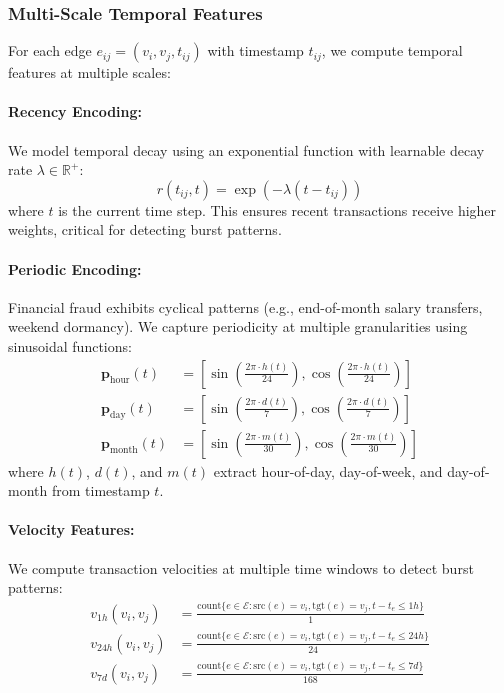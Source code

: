 \subsubsection{Multi-Scale Temporal Features}

For each edge $e_{ij} = (v_i, v_j, t_{ij})$ with timestamp $t_{ij}$, we compute temporal features at multiple scales:

\paragraph{Recency Encoding:} We model temporal decay using an exponential function with learnable decay rate $\lambda \in \mathbb{R}^+$:
\begin{equation}
    r(t_{ij}, t) = \exp\left(-\lambda (t - t_{ij})\right)
\end{equation}
where $t$ is the current time step. This ensures recent transactions receive higher weights, critical for detecting burst patterns.

\paragraph{Periodic Encoding:} Financial fraud exhibits cyclical patterns (e.g., end-of-month salary transfers, weekend dormancy). We capture periodicity at multiple granularities using sinusoidal functions:
\begin{align}
    \mathbf{p}_{\text{hour}}(t) &= \left[\sin\left(\frac{2\pi \cdot h(t)}{24}\right), \cos\left(\frac{2\pi \cdot h(t)}{24}\right)\right] \\
    \mathbf{p}_{\text{day}}(t) &= \left[\sin\left(\frac{2\pi \cdot d(t)}{7}\right), \cos\left(\frac{2\pi \cdot d(t)}{7}\right)\right] \\
    \mathbf{p}_{\text{month}}(t) &= \left[\sin\left(\frac{2\pi \cdot m(t)}{30}\right), \cos\left(\frac{2\pi \cdot m(t)}{30}\right)\right]
\end{align}
where $h(t)$, $d(t)$, and $m(t)$ extract hour-of-day, day-of-week, and day-of-month from timestamp $t$.

\paragraph{Velocity Features:} We compute transaction velocities at multiple time windows to detect burst patterns:
\begin{align}
    v_{1h}(v_i, v_j) &= \frac{\text{count}\{e \in \mathcal{E} : \text{src}(e) = v_i, \text{tgt}(e) = v_j, t - t_e \leq 1h\}}{1} \\
    v_{24h}(v_i, v_j) &= \frac{\text{count}\{e \in \mathcal{E} : \text{src}(e) = v_i, \text{tgt}(e) = v_j, t - t_e \leq 24h\}}{24} \\
    v_{7d}(v_i, v_j) &= \frac{\text{count}\{e \in \mathcal{E} : \text{src}(e) = v_i, \text{tgt}(e) = v_j, t - t_e \leq 7d\}}{168}
\end{align}

